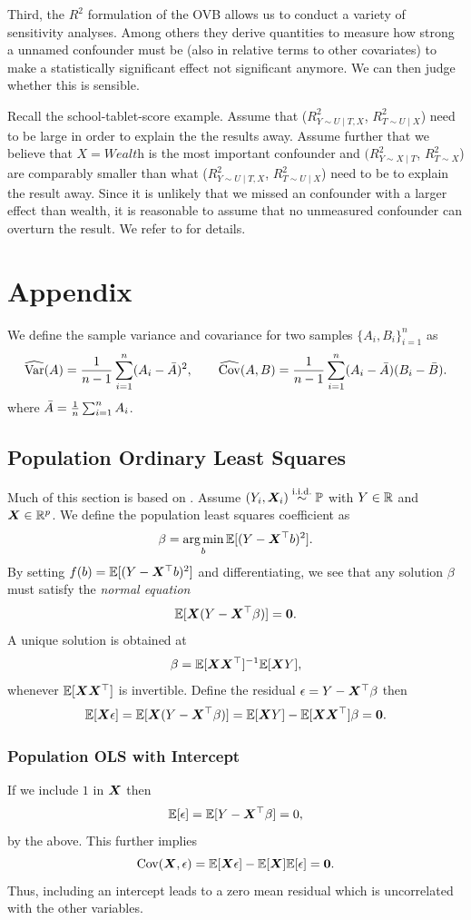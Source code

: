 \documentclass[11pt]{exam}
\begin{document}
Third, the $R^2$ formulation of the OVB allows us to conduct a variety of sensitivity analyses. Among others they derive quantities to measure how strong a unnamed confounder must be (also in relative terms to other covariates) to make a statistically significant effect not significant anymore. We can then judge whether this is sensible.

Recall the school-tablet-score example. Assume that ($R^2_{Y \sim U \mid T, X}$, $R^2_{T \sim U \mid X}$) need to be large in order to explain the the results away. Assume further that we believe that $X = \textit{Wealth}$ is the most important confounder and $(R^2_{Y \sim X \mid T}$, $R^2_{T \sim X}$) are comparably smaller than what  ($R^2_{Y \sim U \mid T, X}$, $R^2_{T \sim U \mid X}$) need to be to explain the result away. Since it is unlikely that we missed an confounder with a larger effect than wealth, it is reasonable to assume that no unmeasured confounder can overturn the result. We refer to \citet{cinelli2020making} for details.


\newpage
\section{Appendix}
We define the sample variance and covariance for two samples $\{A_i, B_i\}_{i = 1}^n$ as
\[
    \widehat{\mathrm{Var}}(A) = \frac{1}{n - 1} \sum_{i=1}^n (A_i - \Bar{A})^2, \qquad \widehat{\mathrm{Cov}}(A, B) = \frac{1}{n-1}\sum_{i=1}^n (A_i - \Bar{A}) (B_i - \Bar{B}).
\]
where $\Bar{A} = \frac{1}{n} \sum_{i = 1}^n A_i$.

\subsection{Population Ordinary Least Squares}
Much of this section is based on \citet[Appendix~B]{ding2023coursecausalinference}. Assume $(Y_i, \bm{X}_i) \overset{\text{i.i.d.}}{\sim} \mathbb{P}$ with $Y \in \mathbb{R}$ and $\bm{X} \in \mathbb{R}^p$. We define the population least squares coefficient as
\[
    \beta = \operatorname*{arg\,min}_b \mathbb{E}[(Y - \bm{X}^\top b)^2].
\]
By setting $f(b) = \mathbb{E}[(Y - \bm{X}^\top b)^2]$ and differentiating, we see that any solution $\beta$ must satisfy the \emph{normal equation}
\[
    \mathbb{E}[\bm{X} (Y - \bm{X}^\top \beta)] = \bm{0}.
\]
A unique solution is obtained at
\[
    \beta = \mathbb{E}[\bm{X}\bm{X}^\top]^{-1} \mathbb{E}[\bm{X} Y],
\]
whenever $\mathbb{E}[\bm{X}\bm{X}^\top]$ is invertible. Define the residual $\epsilon = Y - \bm{X}^\top \beta$ then
\[
    \mathbb{E}[\bm{X} \epsilon] = \mathbb{E}[\bm{X} (Y - \bm{X}^\top \beta)] = \mathbb{E}[\bm{X} Y] - \mathbb{E}[\bm{X} \bm{X}^\top] \beta = \bm{0}.
\]

\subsubsection{Population OLS with Intercept}
If we include $1$ in $\bm{X}$ then 
\[
    \mathbb{E}[\epsilon] = \mathbb{E}[Y - \bm{X}^\top \beta] = 0,
\]
by the above. This further implies 
\[
    \mathrm{Cov}(\bm{X}, \epsilon) = \mathbb{E}[\bm{X} \epsilon] - \mathbb{E}[\bm{X}] \mathbb{E}[\epsilon] = \bm{0}.
\]
Thus, including an intercept leads to a zero mean residual which is uncorrelated with the other variables.
\end{document}
